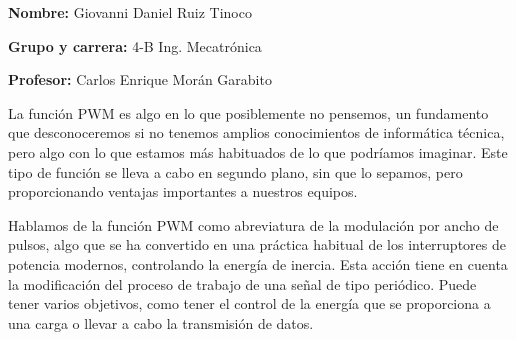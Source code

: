 \documentclass[12pt]{article}
\begin{document}
\par

\begin{Center}
\textbf{Nombre:} Giovanni Daniel Ruiz Tinoco
\end{Center}\par

\begin{Center}
\textbf{Grupo y carrera: }4-B Ing. Mecatrónica
\end{Center}\par

\begin{Center}
\textbf{Profesor: }Carlos Enrique Morán Garabito
\end{Center}\par


\vspace{\baselineskip}

\vspace{\baselineskip}

\vspace{\baselineskip}

\vspace{\baselineskip}

\vspace{\baselineskip}
\setlength{\parskip}{0.0pt}
\newpage
{\fontsize{11pt}{13.2pt}\selectfont \textcolor[HTML]{4E4E4E}{La función \href{http://www.ibertronica.es/refrigeracion/ventiladores/be-quiet-silentwings-2-pwm-120x120.html}{}PWM} \textcolor[HTML]{4E4E4E}{es algo en lo que posiblemente no pensemos, un fundamento que desconoceremos si no tenemos amplios conocimientos de informática técnica, pero algo con lo que estamos más habituados de lo que podríamos imaginar. Este tipo de función se lleva a cabo en segundo plano, sin que lo sepamos, pero proporcionando ventajas importantes a nuestros equipos.}\par}\par

\setlength{\parskip}{12.0pt}
{\fontsize{11pt}{13.2pt}\selectfont \textcolor[HTML]{4E4E4E}{Hablamos de la función PWM como abreviatura de la modulación por ancho de pulsos, algo que se ha convertido en una práctica habitual de los interruptores de potencia modernos, controlando la energía de inercia. Esta acción tiene en cuenta la modificación del proceso de trabajo de una señal de tipo periódico. Puede tener varios objetivos, como tener el control de la energía que se proporciona a una carga o llevar a cabo la transmisión de datos.}\par}\par
\end{document}
